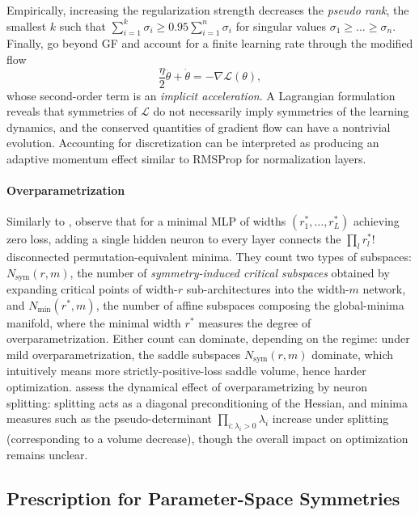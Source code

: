 \documentclass[mathematics,review,submit,moreauthors]{Definitions/mdpi}
\begin{document}
Empirically, increasing the regularization strength decreases the \emph{pseudo rank}, the smallest $k$ such that $\sum_{i=1}^{k}\sigma_i \ge 0.95 \sum_{i=1}^{n}\sigma_i$ for singular values $\sigma_1\ge\dots\ge\sigma_n$.
Finally, \citet{tanaka2021} go beyond GF and account for a finite learning rate through the modified flow
\begin{equation*}
    \frac{\eta}{2}\ddot\theta+\dot\theta=-\nabla\mathcal{L}(\theta),
\end{equation*}
whose second-order term is an \emph{implicit acceleration}.
A Lagrangian formulation reveals that symmetries of $\mathcal{L}$ do not necessarily imply symmetries of the learning dynamics, and the conserved quantities of gradient flow can have a nontrivial evolution.
Accounting for discretization can be interpreted as producing an adaptive momentum effect similar to RMSProp for normalization layers.

\paragraph{Overparametrization}
Similarly to \citet{brea2019}, \citet{simsek2021} observe that for a minimal MLP of widths $(r_1^{*},\dots,r_L^{*})$ achieving zero loss, adding a single hidden neuron to every layer connects the $\prod_l r_l^{*}!$ disconnected permutation-equivalent minima.
They count two types of subspaces: $N_{\mathrm{sym}}(r,m)$, the number of \emph{symmetry-induced critical subspaces} obtained by expanding critical points of width-$r$ sub-architectures into the width-$m$ network, and $N_{\min}(r^{*},m)$, the number of affine subspaces composing the global-minima manifold, where the minimal width $r^{*}$ measures the degree of overparametrization.
Either count can dominate, depending on the regime: under mild overparametrization, the saddle subspaces $N_{\mathrm{sym}}(r,m)$ dominate, which intuitively means more strictly-positive-loss saddle volume, hence harder optimization.
\citet{sareen2026} assess the dynamical effect of overparametrizing by neuron splitting: splitting acts as a diagonal preconditioning of the Hessian, and minima measures such as the pseudo-determinant $\prod_{i:\lambda_i>0}\lambda_i$ increase under splitting (corresponding to a volume decrease), though the overall impact on optimization remains unclear.

\subsection{Prescription for Parameter-Space Symmetries}\label{sec:bug-or-feature}
\end{document}
